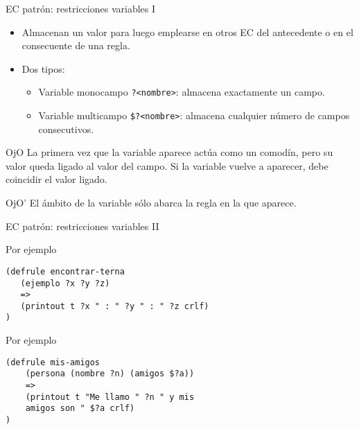 \documentclass[usenames,dvipsnames,aspectratio=169]{beamer}
\begin{document}
\begin{frame}{EC patrón: restricciones variables I}
	\begin{minipage}{.45\textwidth}
	\begin{itemize}
		\item Almacenan un valor para luego emplearse en otros EC del antecedente o en el consecuente de una regla.
		\item Dos tipos:
		\begin{itemize}
			\item Variable monocampo \texttt{?<nombre>}: almacena exactamente un campo.
			\item Variable multicampo \texttt{\$?<nombre>}: almacena cualquier número de campos consecutivos.
		\end{itemize}
	\end{itemize}
	\end{minipage}
	\hfill
	\begin{minipage}{.45\textwidth}
		\begin{block}{OjO}
			La primera vez que la variable aparece actúa como un comodín, pero su valor queda ligado al valor del campo. Si la variable vuelve a aparecer, debe coincidir el valor ligado.
		\end{block}
		\begin{block}{OjO'}
			El ámbito de la variable sólo abarca la regla en la que aparece.
		\end{block}
	\end{minipage}
\end{frame}

\begin{frame}[fragile]{EC patrón: restricciones variables II}
	\begin{minipage}{.45\textwidth}
		\begin{exampleblock}{Por ejemplo}
			\begin{verbatim}
(defrule encontrar-terna
   (ejemplo ?x ?y ?z)
   =>
   (printout t ?x " : " ?y " : " ?z crlf)
)
			\end{verbatim}
		\end{exampleblock}
	\end{minipage}
	\hfill
	\begin{minipage}{.45\textwidth}
		\begin{exampleblock}{Por ejemplo}
			\begin{verbatim}
(defrule mis-amigos
    (persona (nombre ?n) (amigos $?a))
    =>
    (printout t "Me llamo " ?n " y mis
    amigos son " $?a crlf)
)
			\end{verbatim}
		\end{exampleblock}
	\end{minipage}
\end{frame}
\end{document}
